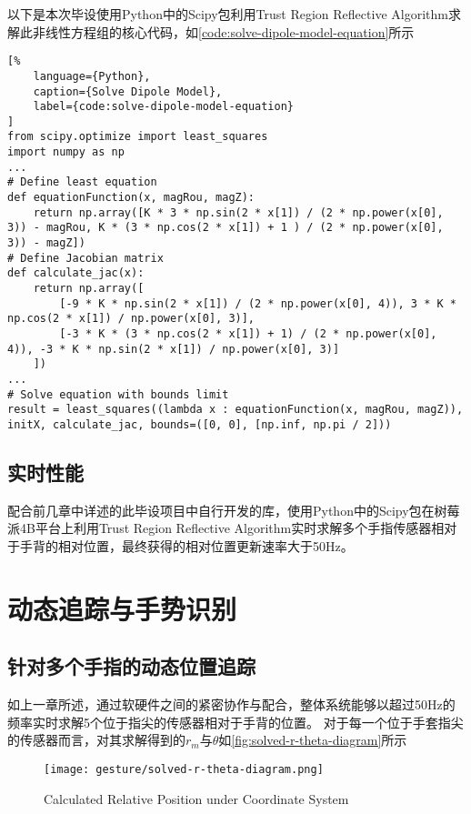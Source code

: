 以下是本次毕设使用Python中的Scipy包利用Trust Region Reflective Algorithm求解此非线性方程组的核心代码，如\autoref{code:solve-dipole-model-equation}所示
\begin{lstlisting}[%
    language={Python},
    caption={Solve Dipole Model},
    label={code:solve-dipole-model-equation}
]
from scipy.optimize import least_squares
import numpy as np
...
# Define least equation
def equationFunction(x, magRou, magZ):
    return np.array([K * 3 * np.sin(2 * x[1]) / (2 * np.power(x[0], 3)) - magRou, K * (3 * np.cos(2 * x[1]) + 1 ) / (2 * np.power(x[0], 3)) - magZ])
# Define Jacobian matrix
def calculate_jac(x):
    return np.array([
        [-9 * K * np.sin(2 * x[1]) / (2 * np.power(x[0], 4)), 3 * K * np.cos(2 * x[1]) / np.power(x[0], 3)],
        [-3 * K * (3 * np.cos(2 * x[1]) + 1) / (2 * np.power(x[0], 4)), -3 * K * np.sin(2 * x[1]) / np.power(x[0], 3)]
    ])
...
# Solve equation with bounds limit
result = least_squares((lambda x : equationFunction(x, magRou, magZ)), initX, calculate_jac, bounds=([0, 0], [np.inf, np.pi / 2]))
\end{lstlisting}

\subsection{实时性能}
配合前几章中详述的此毕设项目中自行开发的库，使用Python中的Scipy包在树莓派4B平台上利用Trust Region Reflective Algorithm实时求解多个手指传感器相对于手背的相对位置，最终获得的相对位置更新速率大于50Hz。

\cleardoublepage
\section{动态追踪与手势识别}
\subsection{针对多个手指的动态位置追踪}
如上一章所述，通过软硬件之间的紧密协作与配合，整体系统能够以超过50Hz的频率实时求解5个位于指尖的传感器相对于手背的位置。
对于每一个位于手套指尖的传感器而言，对其求解得到的$r_m$与$\theta$如\autoref{fig:solved-r-theta-diagram}所示

\begin{figure}[H]
    \centering
    \texttt{[image: gesture/solved-r-theta-diagram.png]}
    \caption{\label{fig:solved-r-theta-diagram}Calculated Relative Position under Coordinate System}
\end{figure}

